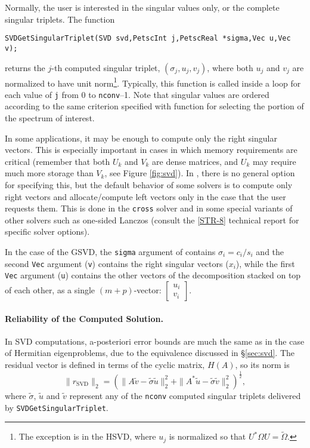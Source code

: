 Normally, the user is interested in the singular values only, or the complete singular triplets. The function
        \begin{Verbatim}[fontsize=\small]
        SVDGetSingularTriplet(SVD svd,PetscInt j,PetscReal *sigma,Vec u,Vec v);
        \end{Verbatim}
returns the $j$-th computed singular triplet, $(\sigma_j,u_j,v_j)$, where both $u_j$ and $v_j$ are normalized to have unit norm\footnote{The exception is in the HSVD, where $u_j$ is normalized so that $U^*\Omega U=\tilde\Omega$.}. Typically, this function is called inside a loop for each value of \texttt{j} from 0 to \texttt{nconv}--1. Note that singular values are ordered according to the same criterion specified with function  for selecting the portion of the spectrum of interest.

In some applications, it may be enough to compute only the right singular vectors. This is especially important in cases in which memory requirements are critical (remember that both $U_k$ and $V_k$ are dense matrices, and $U_k$ may require much more storage than $V_k$, see Figure \ref{fig:svd}). In \slepc, there is no general option for specifying this, but the default behavior of some solvers is to compute only right vectors and allocate/compute left vectors only in the case that the user requests them. This is done in the \texttt{cross} solver and in some special variants of other solvers such as one-sided Lanczos (consult the \hyperlink{str}{[STR-8]} technical report for specific solver options).

In the case of the GSVD, the \texttt{sigma} argument of  contains $\sigma_i=c_i/s_i$ and the second \texttt{Vec} argument (\texttt{v}) contains the right singular vectors ($x_i$), while the first \texttt{Vec} argument (\texttt{u}) contains the other vectors of the decomposition stacked on top of each other, as a single $(m+p)$-vector: $\left[\begin{smallmatrix}u_i\\v_i\end{smallmatrix}\right]$.

\paragraph{Reliability of the Computed Solution.}

In SVD computations, a-posteriori error bounds are much the same as in the case of Hermitian eigenproblems, due to the equivalence discussed in \S\ref{sec:svd}. The residual vector is defined in terms of the cyclic matrix, $H(A)$, so its norm is
\begin{equation}
\|r_\mathrm{SVD}\|_2=\left(\|A\tilde{v}-\tilde{\sigma}\tilde{u}\|_2^2+\|A^*\tilde{u}-\tilde{\sigma}\tilde{v}\|_2^2\right)^{\frac{1}{2}},
\end{equation}
where $\tilde{\sigma}$, $\tilde{u}$ and $\tilde{v}$ represent any of the \texttt{nconv} computed singular triplets delivered by \texttt{SVDGetSingularTriplet}.

